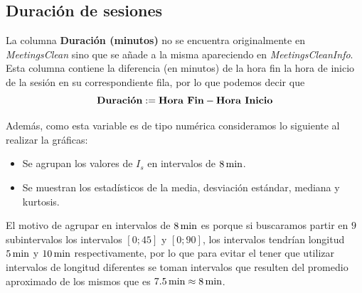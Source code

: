 \documentclass[11pt,a4paper]{book}
\theoremstyle{definition}%
\begin{document}
            \subsection{Duración de sesiones}
                La columna \textbf{Duración (minutos)} no se encuentra originalmente en \textit{MeetingsClean} sino que se añade a la misma apareciendo en \textit{MeetingsCleanInfo}. Esta columna contiene la diferencia (en minutos) de la hora fin la hora de inicio de la sesión en su correspondiente fila, por lo que podemos decir que 
                \begin{equation*}
                    \textup{\textbf{Duración}}:=\textup{\textbf{Hora Fin}}-\textup{\textbf{Hora Inicio}}
                \end{equation*}
                
                Además, como esta variable es de tipo numérica consideramos lo siguiente al realizar la gráficas:
                \begin{itemize}
                    \item Se agrupan los valores de $I_s$ en intervalos de $8\,\textup{min}$.
                    \item Se muestran los estadísticos de la media, desviación estándar, mediana y kurtosis.
                \end{itemize}
                El motivo de agrupar en intervalos de $8\,\textup{min}$ es porque si buscaramos partir en $9$ subintervalos los intervalos $[0;45]$ y $[0;90]$, los intervalos tendrían longitud $5\,\textup{min}$ y $10\,\textup{min}$ respectivamente, por lo que para evitar el tener que utilizar intervalos de longitud diferentes se toman intervalos que resulten del promedio aproximado de los mismos que es $7.5\,\textup{min}\approx8\,\textup{min}$.
\end{document}
